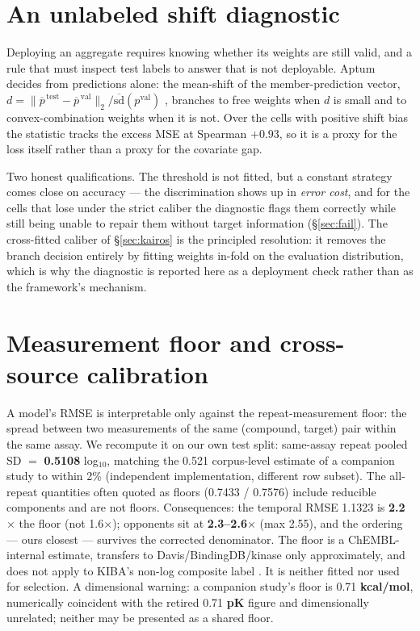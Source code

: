 \documentclass[10pt,letterpaper]{article}
\begin{document}
\section{An unlabeled shift diagnostic}
\label{sec:theta}

Deploying an aggregate requires knowing whether its weights are still valid, and a
rule that must inspect test labels to answer that is not deployable. Aptum decides
from predictions alone: the mean-shift of the member-prediction vector,
$d=\lVert\overline{p}^{\,\text{test}}-\overline{p}^{\,\text{val}}\rVert_2/
\overline{\mathrm{sd}}(p^{\text{val}})$ \citep{gretton2012,sugiyama2007,guo2017}, branches to free weights when $d$ is small
and to convex-combination weights when it is not. Over the cells with positive shift
bias the statistic tracks the excess MSE at Spearman $+0.93$, so it is a proxy for the
loss itself rather than a proxy for the covariate gap.

Two honest qualifications. The threshold is not fitted, but a constant strategy comes
close on accuracy --- the discrimination shows up in \emph{error cost}, and for the
cells that lose under the strict caliber the diagnostic flags them correctly while
still being unable to repair them without target information (\S\ref{sec:fail}). The
cross-fitted caliber of \S\ref{sec:kairos} is the principled resolution: it removes
the branch decision entirely by fitting weights in-fold on the evaluation distribution,
which is why the diagnostic is reported here as a deployment check rather than as the
framework's mechanism.

\section{Measurement floor and cross-source calibration}
\label{sec:floor}

A model's RMSE is interpretable only against the repeat-measurement floor: the spread
between two measurements of the same (compound, target) pair within the same assay.
We recompute it \citep{kramer2012} on our own test split: same-assay repeat pooled SD $=$
\textbf{0.5108} log$_{10}$, matching the 0.521 corpus-level estimate of a companion
study to within 2\% (independent implementation, different row subset). The
all-repeat quantities often quoted as floors (0.7433 / 0.7576) include reducible
components and are not floors. Consequences: the temporal RMSE 1.1323 is
\textbf{2.2$\times$} the floor (not 1.6$\times$); opponents sit at
\textbf{2.3--2.6$\times$} (max 2.55), and the ordering --- ours closest --- survives
the corrected denominator. The floor is a ChEMBL-internal estimate, transfers to
Davis/BindingDB/kinase only approximately, and does not apply to KIBA's non-log
composite label \citep{kuntz1999,jencks1981}. It is neither fitted nor used for selection. A dimensional warning:
a companion study's floor is 0.71 \textbf{kcal/mol}, numerically coincident with the
retired 0.71 \textbf{pK} figure and dimensionally unrelated; neither may be presented
as a shared floor.
\end{document}
